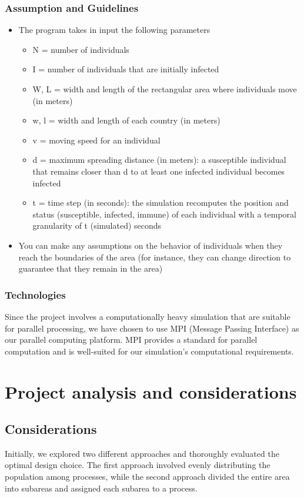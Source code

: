 \documentclass[11pt]{article}
\begin{document}
\subsubsection{Assumption and Guidelines}
\begin{itemize}
    \item The program takes in input the following parameters
    \begin{itemize}
        \item N = number of individuals
        \item I = number of individuals that are initially infected
        \item W, L = width and length of the rectangular area where individuals move (in meters)
        \item w, l = width and length of each country (in meters)
        \item v = moving speed for an individual
        \item d = maximum spreading distance (in meters): a susceptible individual that remains closer than d to at least one infected individual becomes infected 
        \item t = time step (in seconds): the simulation recomputes the position and status (susceptible, infected, immune) of each individual with a temporal granularity of t (simulated) seconds
    \end{itemize}
    \item You can make any assumptions on the behavior of individuals when they reach the boundaries of the area (for instance, they can change direction to guarantee that they remain in the area)
\end{itemize}
\subsubsection{Technologies}
Since the project involves a computationally heavy simulation that are suitable for parallel processing, we have chosen to use MPI (Message Passing Interface) as our parallel computing platform. MPI provides a standard for parallel computation and is well-suited for our simulation's computational requirements.



\section{Project analysis and considerations}
\subsection{Considerations}
Initially, we explored two different approaches and thoroughly evaluated the optimal design choice. The first approach involved evenly distributing the population among processes, while the second approach divided the entire area into subareas and assigned each subarea to a process.
\end{document}
